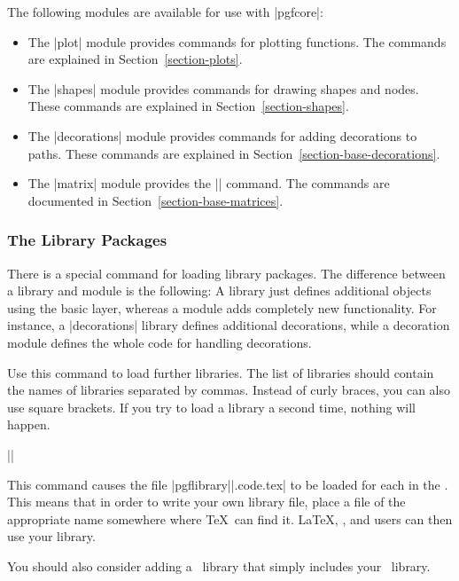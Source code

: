 The following modules are available for use with |pgfcore|: 
%
\begin{itemize}
    \item The |plot| module provides commands for plotting functions. The
        commands are explained in Section~\ref{section-plots}.
    \item The |shapes| module provides commands for drawing shapes and nodes.
        These commands are explained in Section~\ref{section-shapes}.
    \item The |decorations| module provides commands for adding decorations to
        paths. These commands are explained in
        Section~\ref{section-base-decorations}.
    \item The |matrix| module provides the |\pgfmatrix| command. The commands
        are documented in Section~\ref{section-base-matrices}.
\end{itemize}


\subsubsection{The Library Packages}

There is a special command for loading library packages. The difference between
a library and module is the following: A library just defines additional
objects using the basic layer, whereas a module adds completely new
functionality. For instance, a |decorations| library defines additional
decorations, while a decoration module defines the whole code for handling
decorations.

\begin{command}{\usepgflibrary{}}
    Use this command to load further libraries. The list of libraries should
    contain the names of libraries separated by commas. Instead of curly
    braces, you can also use square brackets. If you try to load a library a
    second time, nothing will happen.

    \example ||

    This command causes the file |pgflibrary||.code.tex| to be
    loaded for each  in the . This means
    that in order to write your own library file, place a file of the
    appropriate name somewhere where \TeX\ can find it. \LaTeX, , and
     users can then use your library.

    You should also consider adding a \tikzname\ library that simply includes
    your \pgfname\ library.
\end{command}


